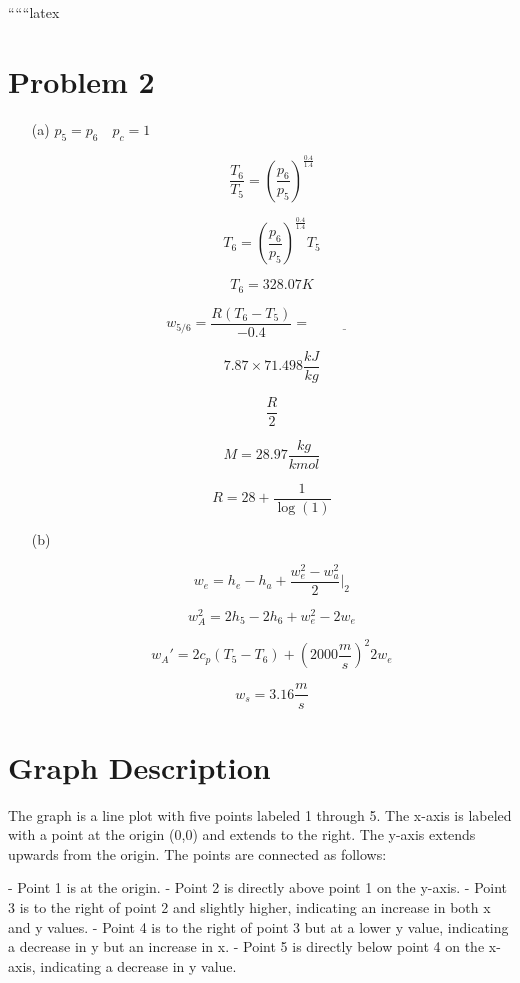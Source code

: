 
``````latex


\section*{Problem 2}

\begin{itemize}
    \item[(a)] $p_5 = p_6 \quad p_c = 1$
    
    \[
    \frac{T_6}{T_5} = \left( \frac{p_6}{p_5} \right)^{\frac{0.4}{1.4}}
    \]
    
    \[
    T_6 = \left( \frac{p_6}{p_5} \right)^{\frac{0.4}{1.4}} T_5
    \]
    
    \[
    T_6 = 328.07 K
    \]
    
    \[
    w_{5/6} = \frac{R \left( T_6 - T_5 \right)}{-0.4} = \underline{\hspace{2cm}}
    \]
    
    \[
    7.87 \times 71.498 \frac{kJ}{kg}
    \]
    
    \[
    \frac{R}{2}
    \]
    
    \[
    M = 28.97 \frac{kg}{kmol}
    \]
    
    \[
    R = 28 + \frac{1}{\log(1)}
    \]
    
    \item[(b)] 
    
    \[
    w_e = h_e - h_a + \frac{w_e^2 - w_a^2}{2} \bigg|_2
    \]
    
    \[
    w_A^2 = 2h_5 - 2h_6 + w_e^2 - 2w_e
    \]
    
    \[
    w_A' = 2c_p \left( T_5 - T_6 \right) + \left( 2000 \frac{m}{s} \right)^2 2w_e
    \]
    
    \[
    w_s = 3.16 \frac{m}{s}
    \]
    
\end{itemize}

\section*{Graph Description}

The graph is a line plot with five points labeled 1 through 5. The x-axis is labeled with a point at the origin (0,0) and extends to the right. The y-axis extends upwards from the origin. The points are connected as follows:

- Point 1 is at the origin.
- Point 2 is directly above point 1 on the y-axis.
- Point 3 is to the right of point 2 and slightly higher, indicating an increase in both x and y values.
- Point 4 is to the right of point 3 but at a lower y value, indicating a decrease in y but an increase in x.
- Point 5 is directly below point 4 on the x-axis, indicating a decrease in y value.

